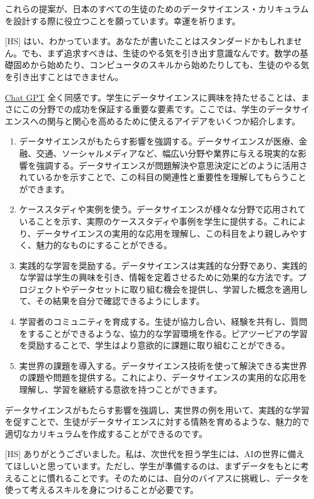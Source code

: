 \documentclass[
]{book}
\theoremstyle{definition}
\theoremstyle{definition}
\theoremstyle{definition}
\theoremstyle{definition}
\theoremstyle{remark}
\begin{document}
これらの提案が、日本のすべての生徒のためのデータサイエンス・カリキュラムを設計する際に役立つことを願っています。幸運を祈ります。

{[}HS{]} はい、わかっています。あなたが書いたことはスタンダードかもしれません。でも、まず追求すべきは、生徒のやる気を引き出す意識なんです。数学の基礎固めから始めたり、コンピュータのスキルから始めたりしても、生徒のやる気を引き出すことはできません。

\protect\hyperlink{chatgpt}{Chat GPT} 全く同感です。学生にデータサイエンスに興味を持たせることは、まさにこの分野での成功を保証する重要な要素です。ここでは、学生のデータサイエンスへの関与と関心を高めるために使えるアイデアをいくつか紹介します。

\begin{enumerate}
\def\labelenumi{\arabic{enumi}.}
\item
  データサイエンスがもたらす影響を強調する。データサイエンスが医療、金融、交通、ソーシャルメディアなど、幅広い分野や業界に与える現実的な影響を強調する。データサイエンスが問題解決や意思決定にどのように活用されているかを示すことで、この科目の関連性と重要性を理解してもらうことができます。
\item
  ケーススタディや実例を使う。データサイエンスが様々な分野で応用されていることを示す、実際のケーススタディや事例を学生に提供する。これにより、データサイエンスの実用的な応用を理解し、この科目をより親しみやすく、魅力的なものにすることができる。
\item
  実践的な学習を奨励する。データサイエンスは実践的な分野であり、実践的な学習は学生の興味を引き、情報を定着させるために効果的な方法です。プロジェクトやデータセットに取り組む機会を提供し、学習した概念を適用して、その結果を自分で確認できるようにします。
\item
  学習者のコミュニティを育成する。生徒が協力し合い、経験を共有し、質問をすることができるような、協力的な学習環境を作る。ピアツーピアの学習を奨励することで、学生はより意欲的に課題に取り組むことができる。
\item
  実世界の課題を導入する。データサイエンス技術を使って解決できる実世界の課題や問題を提供する。これにより、データサイエンスの実用的な応用を理解し、学習を継続する意欲を持つことができます。
\end{enumerate}

データサイエンスがもたらす影響を強調し、実世界の例を用いて、実践的な学習を促すことで、生徒がデータサイエンスに対する情熱を育めるような、魅力的で適切なカリキュラムを作成することができるのです。

{[}HS{]} ありがとうございました。私は、次世代を担う学生には、AIの世界に備えてほしいと思っています。ただし、学生が準備するのは、まずデータをもとに考えることに慣れることです。そのためには、自分のバイアスに挑戦し、データを使って考えるスキルを身につけることが必要です。
\end{document}
